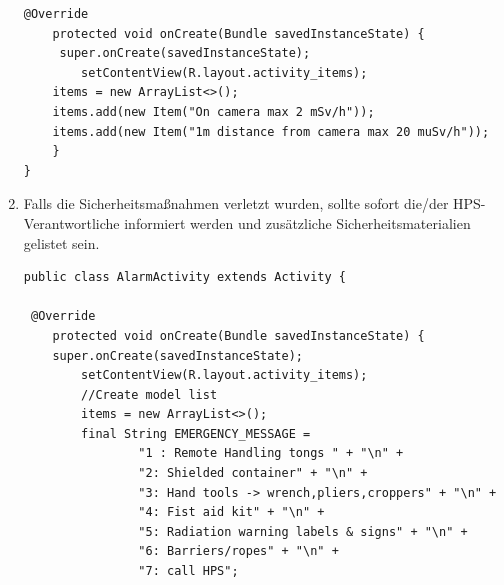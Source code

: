 \begin{enumerate}
\begin{lstlisting}[frame=single]
 @Override
    protected void onCreate(Bundle savedInstanceState) {
     super.onCreate(savedInstanceState);
        setContentView(R.layout.activity_items);
    items = new ArrayList<>();
    items.add(new Item("On camera max 2 mSv/h"));
    items.add(new Item("1m distance from camera max 20 muSv/h"));
    }
}
\end{lstlisting}

\item Falls die Sicherheitsmaßnahmen verletzt wurden, sollte sofort die/der HPS-Verantwortliche
informiert werden und zusätzliche Sicherheitsmaterialien gelistet sein.\\
\begin{lstlisting}[frame=single]
public class AlarmActivity extends Activity {

 @Override
    protected void onCreate(Bundle savedInstanceState) {
    super.onCreate(savedInstanceState);
        setContentView(R.layout.activity_items);
        //Create model list
        items = new ArrayList<>();
        final String EMERGENCY_MESSAGE =
                "1 : Remote Handling tongs " + "\n" +
                "2: Shielded container" + "\n" +
                "3: Hand tools -> wrench,pliers,croppers" + "\n" +
                "4: Fist aid kit" + "\n" +
                "5: Radiation warning labels & signs" + "\n" +
                "6: Barriers/ropes" + "\n" +
                "7: call HPS";
                

\end{lstlisting}
\end{enumerate}

